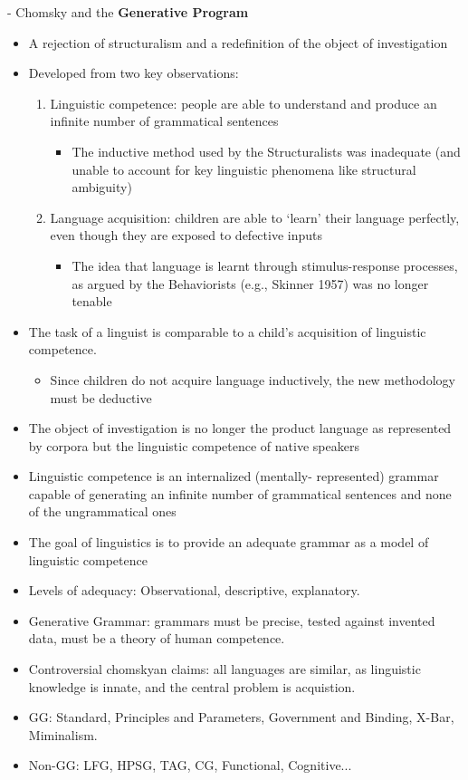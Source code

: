 \documentclass[11pt]{article}
\newenvironment{itemise}{
\begin{itemize}
  \setlength{\itemsep}{1pt}
  \setlength{\parskip}{0pt}
  \setlength{\parsep}{0pt}
}{\end{itemize}}
\begin{document}
- Chomsky and the \textbf{Generative Program}
\begin{itemise}
\item A rejection of structuralism and a redefinition of the object of investigation
\item Developed from two key observations:
  \begin{enumerate}
  \item Linguistic competence: people are able to understand and produce an infinite number of grammatical sentences
    \begin{itemise}
    \item The inductive method used by the Structuralists was inadequate (and unable to account for key linguistic phenomena like structural ambiguity)
    \end{itemise}
  \item Language acquisition: children are able to ‘learn’ their language perfectly, even though they are exposed to defective inputs
    \begin{itemise}
    \item The idea that language is learnt through stimulus-response processes, as argued by the Behaviorists (e.g., Skinner 1957) was no longer tenable
    \end{itemise}
  \end{enumerate}
\item The task of a linguist is comparable to a child’s acquisition of linguistic competence.
  \begin{itemise}
  \item Since children do not acquire language inductively, the new methodology must be deductive
  \end{itemise}
\item The object of investigation is no longer the product language as represented by corpora but the linguistic competence of native speakers
\item Linguistic competence is an internalized (mentally- represented) grammar capable of generating an infinite number of grammatical sentences and none of the ungrammatical ones
\item The goal of linguistics is to provide an adequate grammar as a model of linguistic competence
\item Levels of adequacy: Observational, descriptive, explanatory. 
\item Generative Grammar: grammars must be precise, tested against invented data, must be a theory of human competence. 
\item Controversial chomskyan claims: all languages are similar, as linguistic knowledge is innate, and the central problem is acquistion. 
\item GG: Standard, Principles and Parameters, Government and Binding, X-Bar, Miminalism.
\item Non-GG: LFG, HPSG, TAG, CG, Functional, Cognitive...
\end{itemise}
\end{document}
